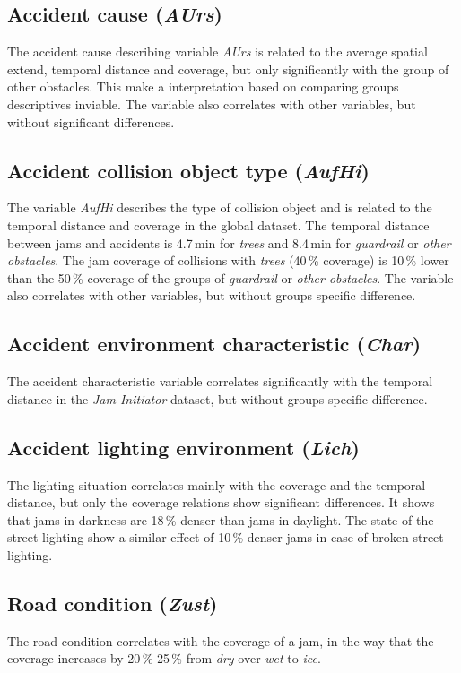 \subsection{Accident cause (\textit{AUrs})}
\label{analysis_sum_AUrs}
The accident cause describing variable \textit{AUrs} is related to the average spatial extend, temporal distance and coverage, but only significantly with the group of other obstacles. This make a interpretation based on comparing groups descriptives inviable. The variable also correlates with other variables, but without significant differences.

\subsection{Accident collision object type (\textit{AufHi})}
\label{analysis_sum_AufHi}
The variable \textit{AufHi} describes the type of collision object and is related to the temporal distance and coverage in the global dataset. The temporal distance between jams and accidents is 4.7\,min for \textit{trees} and 8.4\,min for \textit{guardrail} or \textit{other obstacles}. The jam coverage of collisions with \textit{trees} (40\,\% coverage) is 10\,\% lower than the 50\,\% coverage of the groups of \textit{guardrail} or \textit{other obstacles}. The variable also correlates with other variables, but without groups specific difference.

\subsection{Accident environment characteristic (\textit{Char})}
\label{analysis_sum_Char}
The accident characteristic variable correlates significantly with the temporal distance in the \textit{Jam Initiator} dataset, but without groups specific difference.

\subsection{Accident lighting environment (\textit{Lich})}
\label{analysis_sum_Lich}
The lighting situation correlates mainly with the coverage and the temporal distance, but only the coverage relations show significant differences. It shows that jams in darkness are 18\,\% denser than jams in daylight. The state of the street lighting show a similar effect of 10\,\% denser jams in case of broken street lighting.

\subsection{Road condition (\textit{Zust})}
\label{analysis_sum_Zust}
The road condition correlates with the coverage of a jam, in the way that the coverage increases by 20\,\%-25\,\% from \textit{dry} over \textit{wet} to \textit{ice}.

